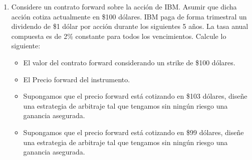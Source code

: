 \documentclass{article}
\begin{document}
\begin{enumerate}
\item Considere un contrato forward sobre la acción de IBM. 
      Asumir que dicha acción cotiza actualmente en \$100 dólares.
      IBM paga de forma trimestral un dividendo de \$1 dólar por acción durante
      los siguientes 5 años. La tasa anual compuesta es de 2\% constante para
      todos los vencimientos. Calcule lo siguiente:
      \begin{itemize}
        \item El valor del contrato forward considerando un strike de \$100 dólares.
        \item El Precio forward del instrumento.
        \item Supongamos que el precio forward está cotizando en \$103 dólares, diseñe
            una estrategia de arbitraje tal que tengamos sin ningún riesgo una ganancia asegurada.
            \item Supongamos que el precio forward está cotizando en \$99 dólares, diseñe
            una estrategia de arbitraje tal que tengamos sin ningún riesgo una ganancia asegurada.
      \end{itemize}


\end{enumerate}
\end{document}
